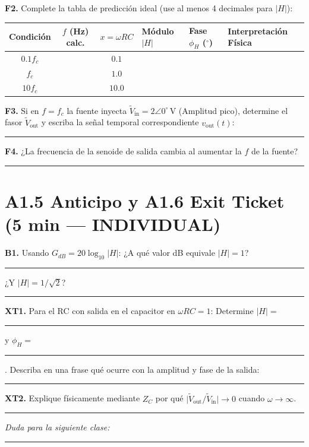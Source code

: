 \documentclass[11pt, a4paper]{article}
\begin{document}
\noindent\textbf{F2.} Complete la tabla de predicción ideal (use al menos 4 decimales para $\vert{}H\vert{}$):
\vspace{0.1cm}

\renewcommand{\arraystretch}{1.5}
\noindent
\begin{tabularx}{\textwidth}{|c|c|c|X|X|X|}
\hline
\textbf{Condición} & \textbf{$f$ (Hz) calc.} & \textbf{$x = \omega RC$} & \textbf{Módulo $\vert{}H\vert{}$} & \textbf{Fase $\phi_H$ ($^\circ$)} & \textbf{Interpretación Física} \\
\hline
$0.1 f_c$ & & $0.1$ & & & \\
\hline
$f_c$ & & $1.0$ & & & \\
\hline
$10 f_c$ & & $10.0$ & & & \\
\hline
\end{tabularx}

\vspace{0.3cm}
\noindent\textbf{F3.} Si en $f = f_c$ la fuente inyecta $\tilde{V}_{\text{in}} = 2\angle 0^\circ\,\text{V}$ (Amplitud pico), determine el fasor $\tilde{V}_{\text{out}}$ y escriba la señal temporal correspondiente $v_{\text{out}}(t)$: \par\vspace{0.1cm}
\noindent\rule{\textwidth}{0.4pt} \par\vspace{0.2cm}

\noindent\textbf{F4.} ¿La frecuencia de la senoide de salida cambia al aumentar la $f$ de la fuente? \rule{3cm}{0.4pt}

\section*{A1.5 Anticipo y A1.6 Exit Ticket (5 min — INDIVIDUAL)}
\textbf{B1.} Usando $G_{dB} = 20 \log_{10} \vert{}H\vert{}$: ¿A qué valor dB equivale $\vert{}H\vert{}=1$? \rule{2cm}{0.4pt} ¿Y $\vert{}H\vert{}=1/\sqrt{2}$? \rule{2cm}{0.4pt} \par\vspace{0.2cm}

\noindent\textbf{XT1.} Para el RC con salida en el capacitor en $\omega RC = 1$: Determine $\vert{}H\vert{} =$ \rule{1.5cm}{0.4pt} y $\phi_H =$ \rule{1.5cm}{0.4pt}. Describa en una frase qué ocurre con la amplitud y fase de la salida: \par
\noindent\rule{\textwidth}{0.4pt} \par\vspace{0.2cm}

\noindent\textbf{XT2.} Explique físicamente mediante $Z_C$ por qué $\vert{}\tilde{V}_{\text{out}} / \tilde{V}_{\text{in}}\vert{} \to 0$ cuando $\omega \to \infty$. \par\vspace{0.1cm}
\noindent\rule{\textwidth}{0.4pt} \par\vspace{0.3cm}
\textit{Duda para la siguiente clase:} \rule{10cm}{0.4pt}
\end{document}

